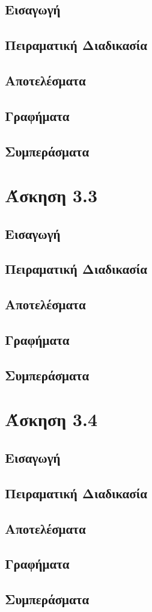 \documentclass{article}
\begin{document}
\subsection*{Εισαγωγή}
\subsection*{Πειραματική Διαδικασία}
\subsection*{Αποτελέσματα}
\subsection*{Γραφήματα}
\subsection*{Συμπεράσματα}
\section*{Άσκηση 3.3}
\subsection*{Εισαγωγή}
\subsection*{Πειραματική Διαδικασία}
\subsection*{Αποτελέσματα}
\subsection*{Γραφήματα}
\subsection*{Συμπεράσματα}
\section*{Άσκηση 3.4}
\subsection*{Εισαγωγή}
\subsection*{Πειραματική Διαδικασία}
\subsection*{Αποτελέσματα}
\subsection*{Γραφήματα}
\subsection*{Συμπεράσματα}
\end{document}
